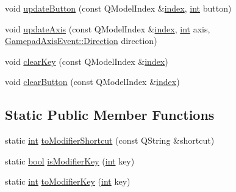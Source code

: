 \begin{DoxyCompactItemize}
\item 
void \mbox{\hyperlink{class_q_g_b_a_1_1_shortcut_controller_a1f49dde502461ba467e49d81c458271b}{update\+Button}} (const Q\+Model\+Index \&\mbox{\hyperlink{class_q_g_b_a_1_1_shortcut_controller_ae75cb760bb05d9e1e20b8f1080884cbd}{index}}, \mbox{\hyperlink{ioapi_8h_a787fa3cf048117ba7123753c1e74fcd6}{int}} button)
\item 
void \mbox{\hyperlink{class_q_g_b_a_1_1_shortcut_controller_acb5c4ceb4c05eb8a2352d386250a6ab3}{update\+Axis}} (const Q\+Model\+Index \&\mbox{\hyperlink{class_q_g_b_a_1_1_shortcut_controller_ae75cb760bb05d9e1e20b8f1080884cbd}{index}}, \mbox{\hyperlink{ioapi_8h_a787fa3cf048117ba7123753c1e74fcd6}{int}} axis, \mbox{\hyperlink{class_q_g_b_a_1_1_gamepad_axis_event_a5d50ab74dce4e58252f2affb5f227bbc}{Gamepad\+Axis\+Event\+::\+Direction}} direction)
\item 
void \mbox{\hyperlink{class_q_g_b_a_1_1_shortcut_controller_a167909d55afa7282830db1d7233e464e}{clear\+Key}} (const Q\+Model\+Index \&\mbox{\hyperlink{class_q_g_b_a_1_1_shortcut_controller_ae75cb760bb05d9e1e20b8f1080884cbd}{index}})
\item 
void \mbox{\hyperlink{class_q_g_b_a_1_1_shortcut_controller_a0dee45b9b1236169cc78028924a60325}{clear\+Button}} (const Q\+Model\+Index \&\mbox{\hyperlink{class_q_g_b_a_1_1_shortcut_controller_ae75cb760bb05d9e1e20b8f1080884cbd}{index}})
\end{DoxyCompactItemize}
\subsection*{Static Public Member Functions}
\begin{DoxyCompactItemize}
\item 
static \mbox{\hyperlink{ioapi_8h_a787fa3cf048117ba7123753c1e74fcd6}{int}} \mbox{\hyperlink{class_q_g_b_a_1_1_shortcut_controller_ab8daaf3e0879b0fd47e64b666a86a7e1}{to\+Modifier\+Shortcut}} (const Q\+String \&shortcut)
\item 
static \mbox{\hyperlink{libretro_8h_a4a26dcae73fb7e1528214a068aca317e}{bool}} \mbox{\hyperlink{class_q_g_b_a_1_1_shortcut_controller_aabad72de91824aeebe6593dfb16c1845}{is\+Modifier\+Key}} (\mbox{\hyperlink{ioapi_8h_a787fa3cf048117ba7123753c1e74fcd6}{int}} key)
\item 
static \mbox{\hyperlink{ioapi_8h_a787fa3cf048117ba7123753c1e74fcd6}{int}} \mbox{\hyperlink{class_q_g_b_a_1_1_shortcut_controller_a358ace743ae3c305cee270a0d54d6c82}{to\+Modifier\+Key}} (\mbox{\hyperlink{ioapi_8h_a787fa3cf048117ba7123753c1e74fcd6}{int}} key)
\end{DoxyCompactItemize}
